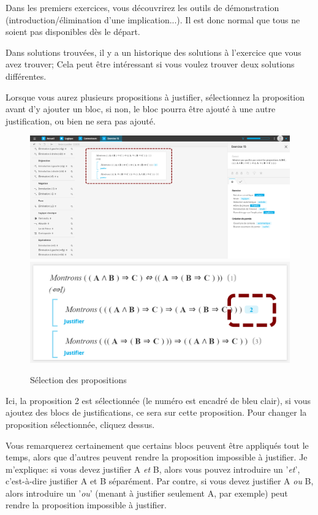 \documentclass[a4paper]{article}
\begin{document}
Dans les premiers exercices, vous découvrirez les outils de démonstration (introduction/élimination d'une implication...). Il est donc normal que tous ne soient pas disponibles dès le départ.

Dans solutions trouvées, il y a un historique des solutions à l'exercice que vous avez trouver; Cela peut être intéressant si vous voulez trouver deux solutions différentes.

Lorsque vous aurez plusieurs propositions à justifier, sélectionnez la proposition avant d'y ajouter un bloc, si non, le bloc pourra être ajouté à une autre justification, ou bien ne sera pas ajouté.
\begin{figure}[h!]
\begin{center}
\includegraphics[scale=0.05]{img_app6.png}
\includegraphics[scale=0.16]{img_app7.png}
\end{center}
\caption{Sélection des propositions}\label{im:selec_prop}
\end{figure}
\FloatBarrier

Ici, la proposition 2 est sélectionnée (le numéro est encadré de bleu clair), si vous ajoutez des blocs de justifications, ce sera sur cette proposition.
Pour changer la proposition sélectionnée, cliquez dessus.

Vous remarquerez certainement que certains blocs peuvent être appliqués tout le temps, alors que d'autres peuvent rendre la proposition impossible à justifier.
Je m'explique: si vous devez justifier A \textit{et} B, alors vous pouvez introduire un '\textit{et}', c'est-à-dire justifier A et B séparément.
Par contre, si vous devez justifier A \textit{ou} B, alors introduire un '\textit{ou}' (menant à justifier seulement A, par exemple) peut rendre la proposition impossible à justifier.
\end{document}
